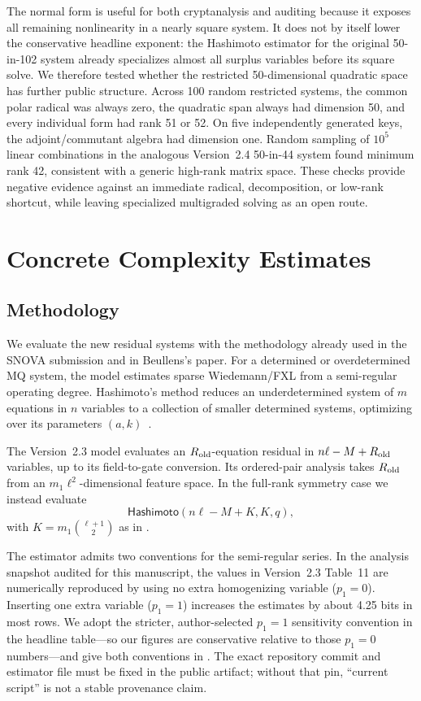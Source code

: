 \documentclass[11pt]{article}
\newcommand{\Hashimoto}{\mathsf{Hashimoto}}
\newcommand{\SNOVA}{\textsf{SNOVA}}
\begin{document}
The normal form is useful for both cryptanalysis and auditing because it exposes all remaining nonlinearity in a nearly square system.  It does not by itself lower the conservative headline exponent: the Hashimoto estimator for the original 50-in-102 system already specializes almost all surplus variables before its square solve.  We therefore tested whether the restricted 50-dimensional quadratic space has further public structure.  Across 100 random restricted systems, the common polar radical was always zero, the quadratic span always had dimension 50, and every individual form had rank 51 or 52.  On five independently generated keys, the adjoint/commutant algebra had dimension one.  Random sampling of $10^5$ linear combinations in the analogous Version~2.4 50-in-44 system found minimum rank 42, consistent with a generic high-rank matrix space.  These checks provide negative evidence against an immediate radical, decomposition, or low-rank shortcut, while leaving specialized multigraded solving as an open route.

\section{Concrete Complexity Estimates}\label{sec:complexity}

\subsection{Methodology}

We evaluate the new residual systems with the methodology already used in the \SNOVA{} submission and in Beullens's paper.  For a determined or overdetermined MQ system, the model estimates sparse Wiedemann/FXL from a semi-regular operating degree.  Hashimoto's method reduces an underdetermined system of $m$ equations in $n$ variables to a collection of smaller determined systems, optimizing over its parameters $(a,k)$~\cite{Hashimoto2023,Beullens2024SNOVA}.

The Version~2.3 model evaluates an $R_{\rm old}$-equation residual in
$n\ell-M+R_{\rm old}$ variables, up to its field-to-gate conversion.  Its
ordered-pair analysis takes $R_{\rm old}$ from an $m_1\ell^2$-dimensional
feature space.  In the full-rank symmetry case we instead evaluate
\[
 \Hashimoto(n\ell-M+K,K,q),
\]
with $K=m_1\binom{\ell+1}{2}$ as in .

The estimator admits two conventions for the semi-regular series.  In the
analysis snapshot audited for this manuscript, the values in Version~2.3
Table~11 are numerically reproduced by using no extra homogenizing variable
($p_1=0$).  Inserting one extra variable ($p_1=1$) increases the estimates by
about 4.25 bits in most rows.  We adopt the stricter, author-selected $p_1=1$
sensitivity convention in the headline table---so our figures are conservative
relative to those $p_1=0$ numbers---and give both conventions in
.  The exact repository commit and estimator file must be fixed
in the public artifact; without that pin, ``current script'' is not a stable
provenance claim.
\end{document}
